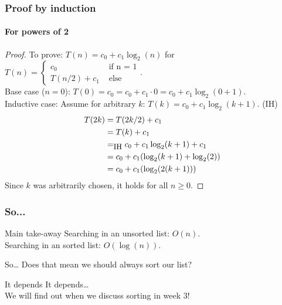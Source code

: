 \begin{frame}
	\frametitle{Proof by induction}
	\framesubtitle{For powers of 2}
	\begin{proof}
		To prove: $T(n) = c_0 + c_1 \log_2(n)$ for $T(n)= \begin{cases}
			c_0 & \text{ if n = 1}\\
			T(n/2) + c_1 & \text{ else}
		\end{cases}$.	\\
		Base case ($n=0$): $T(0) = c_0 = c_0 + c_1 \cdot 0 = c_0 + c_1\log_2(0+1)$.\\
		Inductive case:
		Assume for arbitrary $k$: $T(k) = c_0 + c_1 \log_2(k+1)$. (IH)\\
		\vspace*{-15pt}
		\begin{align*}
			T(2k) &= T(2k/2) + c_1\\
					 &= T(k) + c_1\\
					 &=_\text{\small IH} c_0 + c_1\log_2(k+1) + c_1\\
					 &= c_0 + c_1(\log_2(k+1) + \log_2(2))\\
					 &= c_0 + c_1(\log_2(2(k+1)))
		\end{align*}
		Since $k$ was arbitrarily chosen, it holds for all $n \geq 0$.
	\end{proof}
\end{frame}

\begin{frame}
	\frametitle{So...}
		\begin{exampleblock}{Main take-away}
			Searching in an unsorted list: $O(n)$.\\
			Searching in an sorted list: $O(\log(n))$.
		\end{exampleblock}	
		\pause
		\begin{questionblock}{So\dots}
			Does that mean we should always sort our list?
		\end{questionblock}
		\pause
		\begin{answerblock}{It depends}
			It depends\dots\\
			We will find out when we discuss sorting in week 3!
		\end{answerblock}
\end{frame}
